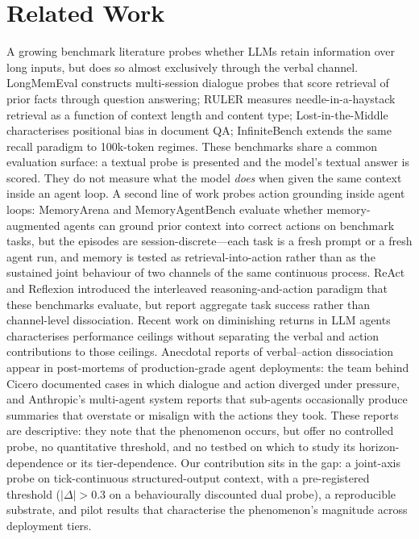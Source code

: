 \section{Related Work}
\label{sec:related}

A growing benchmark literature probes whether LLMs retain
information over long inputs, but does so almost exclusively
through the verbal channel. LongMemEval \citep{Wu2025LongMemEval}
constructs multi-session dialogue probes that score retrieval of
prior facts through question answering; RULER
\citep{Hsieh2024RULER} measures needle-in-a-haystack retrieval as a
function of context length and content type; Lost-in-the-Middle
\citep{Liu2024LostInMiddle} characterises positional bias in
document QA; InfiniteBench \citep{Zhang2024InfiniteBench} extends
the same recall paradigm to 100k-token regimes. These benchmarks
share a common evaluation surface: a textual probe is presented and
the model's textual answer is scored. They do not measure what the
model \emph{does} when given the same context inside an agent loop.
A second line of work probes action grounding inside agent loops:
MemoryArena \citep{He2026MemoryArena} and MemoryAgentBench
\citep{Hu2025MemoryAgentBench} evaluate whether memory-augmented
agents can ground prior context into correct actions on benchmark
tasks, but the episodes are session-discrete---each task is a
fresh prompt or a fresh agent run, and memory is tested as
retrieval-into-action rather than as the sustained joint behaviour
of two channels of the same continuous process. ReAct
\citep{Yao2023ReAct} and Reflexion \citep{Shinn2023Reflexion}
introduced the interleaved reasoning-and-action paradigm that these
benchmarks evaluate, but report aggregate task success rather than
channel-level dissociation. Recent work on diminishing returns in
LLM agents \citep{Sinha2025IllusionDiminishingReturns} characterises
performance ceilings without separating the verbal and action
contributions to those ceilings. Anecdotal reports of
verbal--action dissociation appear in post-mortems of
production-grade agent deployments: the team behind Cicero
\citep{FAIR2022Cicero} documented cases in which dialogue and
action diverged under pressure, and Anthropic's multi-agent system
\citep{AnthropicMultiAgent2025} reports that sub-agents
occasionally produce summaries that overstate or misalign with the
actions they took. These reports are descriptive: they note that
the phenomenon occurs, but offer no controlled probe, no
quantitative threshold, and no testbed on which to study its
horizon-dependence or its tier-dependence. Our contribution sits in
the gap: a joint-axis probe on tick-continuous structured-output
context, with a pre-registered threshold ($|\Delta| > 0.3$ on a
behaviourally discounted dual probe), a reproducible substrate, and
pilot results that characterise the phenomenon's magnitude across
deployment tiers.
